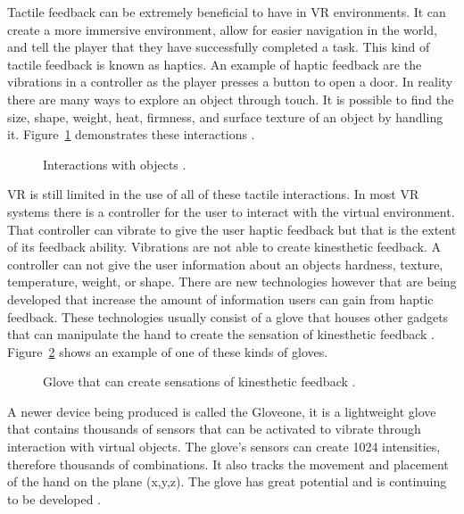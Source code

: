  
Tactile feedback can be extremely beneficial to have in VR environments. It can create a more immersive environment, allow for easier navigation in the world, and tell the player that they have successfully completed a task. This kind of tactile feedback is known as haptics. An example of haptic feedback are the vibrations in a controller as the player presses a button to open a door. In reality there are many ways to explore an object through touch. It is possible to find the size, shape, weight, heat, firmness, and surface texture of an object by handling it. Figure~\ref{fig:hapticExplortion} demonstrates these interactions \cite{LaValle2017}. 
\begin{figure}[!ht]
	\begin{center}
	\end{center}
	\caption{Interactions with objects \cite{LaValle2017}.} 	\label{fig:hapticExplortion}
\end{figure}VR is still limited in the use of all of these tactile interactions. In most VR systems there is a controller for the user to interact with the virtual environment. That controller can vibrate to give the user haptic feedback but that is the extent of its feedback ability. Vibrations are not able to create kinesthetic feedback. A controller can not give the user information about an objects hardness, texture, temperature, weight, or shape. There are new technologies however that are being developed that increase the amount of information users can gain from haptic feedback. These technologies usually consist of a glove that houses other gadgets that can manipulate the hand to create the sensation of kinesthetic feedback \cite{Mazuryk}. Figure~\ref{fig:forceFeedback} shows an example of one of these kinds of gloves. 
\begin{figure}[!ht]
	\begin{center}
	\end{center}
	\caption{Glove that can create sensations of kinesthetic feedback \cite{Mazuryk}.} \label{fig:forceFeedback}
\end{figure}A newer device being produced is called the Gloveone, it is a lightweight glove that contains thousands of sensors that can be activated to vibrate through interaction with virtual objects. The glove's sensors can create 1024 intensities, therefore thousands of combinations. It also tracks the movement and placement of the hand on the plane (x,y,z). The glove has great potential and is continuing to be developed \cite{JIS2}. 


